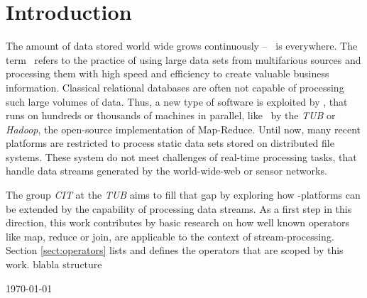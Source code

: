 \section{Introduction}
\label{sect:introduction}

The amount of data stored world wide grows continuously -- \BigData\ is everywhere. The term \BigData\ refers to the practice of using large data sets from multifarious sources and processing them with high speed and efficiency to create valuable business information. Classical relational databases are often not capable of processing such large volumes of data. Thus, a new type of software is exploited by \BigData, that runs on hundreds or thousands of machines in parallel, like \Stratosphere\ by the \textsl{\ac{TUB}} or \textsl{Hadoop}, the open-source implementation of Map-Reduce. Until now, many recent platforms are restricted to process static data sets stored on distributed file systems. These system do not meet challenges of real-time processing tasks, that handle data streams generated by the world-wide-web or sensor networks.

The group \textsl{\ac{CIT}} at the \textsl{\ac{TUB}} aims to fill that gap by exploring how \BigData-platforms can be extended by the capability of processing data streams. As a first step in this direction, this work contributes by basic research on how well known operators like map, reduce or join, are applicable to the context of stream-processing. Section \ref{sect:operators} lists and defines the operators that are scoped by this work. blabla structure

%
%
 
	\hfill \today